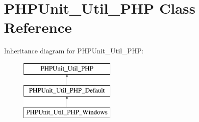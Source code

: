 \hypertarget{class_p_h_p_unit___util___p_h_p}{}\section{P\+H\+P\+Unit\+\_\+\+Util\+\_\+\+P\+HP Class Reference}
\label{class_p_h_p_unit___util___p_h_p}
Inheritance diagram for P\+H\+P\+Unit\+\_\+\+Util\+\_\+\+P\+HP\+:\begin{figure}[H]
\begin{center}
\leavevmode
\includegraphics[height=3.000000cm]{class_p_h_p_unit___util___p_h_p}
\end{center}
\end{figure}
